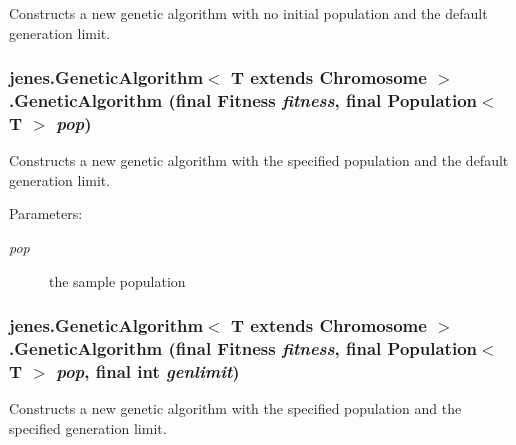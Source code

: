 Constructs a new genetic algorithm with no initial population and the default generation limit. \hypertarget{classjenes_1_1_genetic_algorithm_3_01_t_01extends_01_chromosome_01_4_08a57814b09412baed3146d2cc6e2174}{
\subsubsection[GeneticAlgorithm]{\setlength{\rightskip}{0pt plus 5cm}jenes.GeneticAlgorithm$<$ T extends Chromosome $>$.GeneticAlgorithm (final Fitness {\em fitness}, \/  final Population$<$ T $>$ {\em pop})}}
\label{classjenes_1_1_genetic_algorithm_3_01_t_01extends_01_chromosome_01_4_08a57814b09412baed3146d2cc6e2174}


Constructs a new genetic algorithm with the specified population and the default generation limit. 

\begin{Desc}
\item[Parameters:]
\begin{description}
\item[{\em pop}]the sample population \end{description}
\end{Desc}
\hypertarget{classjenes_1_1_genetic_algorithm_3_01_t_01extends_01_chromosome_01_4_f3997e737162629c161c04a65dd830a0}{
\subsubsection[GeneticAlgorithm]{\setlength{\rightskip}{0pt plus 5cm}jenes.GeneticAlgorithm$<$ T extends Chromosome $>$.GeneticAlgorithm (final Fitness {\em fitness}, \/  final Population$<$ T $>$ {\em pop}, \/  final int {\em genlimit})}}
\label{classjenes_1_1_genetic_algorithm_3_01_t_01extends_01_chromosome_01_4_f3997e737162629c161c04a65dd830a0}


Constructs a new genetic algorithm with the specified population and the specified generation limit. 

